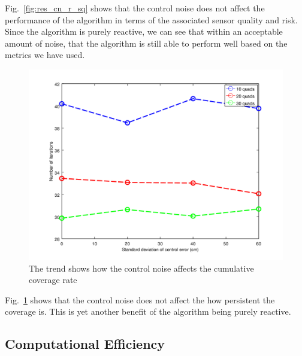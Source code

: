 \documentclass{article}
\begin{document}
Fig.~\ref{fig:res_cn_r_sq} shows that the control noise does not affect the
performance of the algorithm in terms of the associated sensor quality and
risk. Since the algorithm is purely reactive, we can see that within an
acceptable amount of noise, that the algorithm is still able to perform well
based on the metrics we have used.

\begin{figure}

    \includegraphics[width=1\columnwidth]{tasefigs/perf_cn.png}

    \caption{The trend shows how the control noise affects the cumulative
    coverage rate}

    \label{fig:res_perf_cn}

\end{figure}

Fig.~\ref{fig:res_perf_cn} shows that the control noise does not affect the how
persistent the coverage is. This is yet another benefit of the algorithm being
purely reactive.

\subsection{Computational Efficiency}
\end{document}

